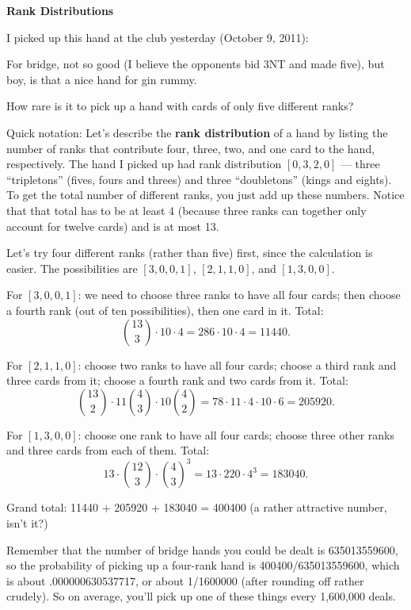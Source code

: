 

\textbf{\LARGE Rank Distributions}

I picked up this hand at the club yesterday (October 9, 2011):


For bridge, not so good (I believe the opponents bid 3NT and made five), 
but boy, is that a nice hand for gin rummy.

How rare is it to pick up a hand with cards of only five different ranks?

Quick notation: Let's describe the \textbf{rank distribution} of a hand
by listing the number of ranks that contribute four, three, two, and one
card to the hand, respectively.  The hand I picked up had rank distribution $[0,3,2,0]$ --- three ``tripletons''
(fives, fours and threes) and three ``doubletons'' (kings and eights).
To get the total number of different ranks, you just add up these numbers.
Notice that that total has to be at least 4 (because three ranks can together
only account for twelve cards) and is at most 13.

Let's try four different ranks (rather than five) first, since the calculation is easier.  
The possibilities are $[3,0,0,1]$, $[2,1,1,0]$, and $[1,3,0,0]$.

For $[3,0,0,1]$: we need to choose three ranks to have all four cards; then 
choose a fourth rank (out of ten possibilities), then one card in it. 
Total:
  \[
  \binom{13}{3}\cdot10\cdot4 = 286\cdot10\cdot4 = 11440.
  \]

For $[2,1,1,0]$: choose two ranks to have all four cards; choose a third rank 
and three cards from it; choose a fourth rank and two cards from it. 
Total:
  \[
  \binom{13}{2}\cdot11\binom{4}{3}\cdot10\binom{4}{2} =
  78\cdot11\cdot4\cdot10\cdot6 = 205920.
  \]

For $[1,3,0,0]$: choose one rank to have all four cards; choose three other 
ranks and three cards from each of them. Total:
  \[
  13\cdot\binom{12}{3}\cdot\binom{4}{3}^3
  = 13\cdot220\cdot4^3 = 183040.
  \]

Grand total: 11440 + 205920 + 183040 = 400400 (a rather attractive 
number, isn't it?)

Remember that the number of bridge hands you could be dealt is 
635013559600, so the probability of picking up a four-rank hand is 
400400/635013559600, which is about .000000630537717, or about 1/1600000 
(after rounding off rather crudely).  So on average, you'll pick 
up one of these things every 1,600,000 deals.

